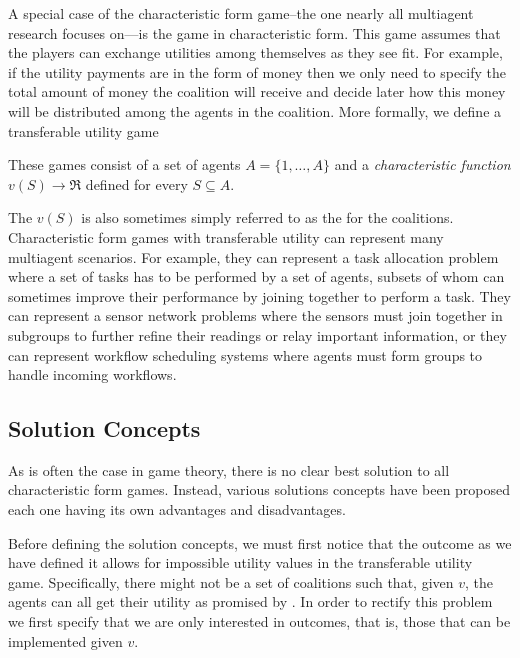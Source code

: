 A special case of the characteristic form game--the one nearly all
multiagent research focuses on---is the  game
in characteristic form. This game assumes that the players can
exchange utilities among themselves as they see fit. For example, if
the utility payments are in the form of money then we only need to
specify the total amount of money the coalition will receive and
decide later how this money will be distributed among the agents in
the coalition.  More formally, we define a transferable utility game

\begin{definition} These
  games consist of a set of agents $A = \{1,\ldots,A\}$ and a
  \emph{characteristic function} $v(S) \rightarrow \Re$ defined for
  every $S \subseteq A$.
\end{definition}

The  $v(S)$ is also sometimes simply
referred to as the  for the coalitions.
Characteristic form games with transferable utility can represent many
multiagent scenarios. For example, they can represent a task
allocation problem where a set of tasks has to be performed by a set
of agents, subsets of whom can sometimes improve their performance by
joining together to perform a task. They can represent a sensor
network problems where the sensors must join together in subgroups to
further refine their readings or relay important information, or they
can represent workflow scheduling systems where agents must form
groups to handle incoming workflows.

\subsection{Solution Concepts}

As is often the case in game theory, there is no clear best solution
to all characteristic form games. Instead, various solutions concepts
have been proposed each one having its own advantages and
disadvantages.

Before defining the solution concepts, we must first notice that the
outcome as we have defined it allows for impossible utility values in
the transferable utility game. Specifically, there might not be a set
of coalitions such that, given $v$, the agents can all get their
utility as promised by \vu{}. In order to rectify this problem we
first specify that we are only interested in  outcomes,
that is, those that can be implemented given $v$.

